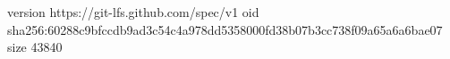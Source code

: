 version https://git-lfs.github.com/spec/v1
oid sha256:60288c9bfccdb9ad3c54c4a978dd5358000fd38b07b3cc738f09a65a6a6bae07
size 43840
